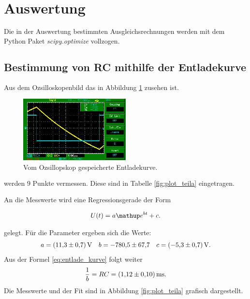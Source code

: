 \section{Auswertung}
Die in der Auswertung bestimmten Ausgleichsrechnungen werden mit
dem Python Paket \emph{scipy.optimize} vollzogen.

\subsection{Bestimmung von RC mithilfe der Entladekurve}

Aus dem Ozsilloskopenbild das in Abbildung \ref{fig:entladekurve} zusehen ist.

\begin{figure}
  \centering
  \includegraphics[width=0.5\textwidth]{pics/bilda_508hz.png}
  \caption{Vom Ozsillopskop gespeicherte Entladekurve.}
  \label{fig:entladekurve}
\end{figure}
werden  $9$ Punkte vermessen.
Diese sind in Tabelle \ref{fig:plot_teila} eingetragen.
\FloatBarrier

\FloatBarrier
An die Messwerte wird eine Regressionsgerade der Form

\begin{equation*}
  U(t)=a\map{e}^{bt}+c.
\end{equation*}

gelegt.
Für die Parameter ergeben sich die Werte:
\begin{equation}
  \label{eq:parameter_teila}
a=\SI{11.3\pm0.7}{\volt} \quad b=\num{-780.5\pm67.7} \quad c=\SI{-5.3\pm0.7}{\volt}.
\end{equation}
Aus der Formel  \eqref{eq:entlade_kurve} folgt weiter
\begin{equation}
  \frac{1}{b}=RC=\SI{1.12\pm0.1}{\milli\second}.
\end{equation}
Die Messwerte und der Fit sind in Abbildung \ref{fig:plot_teila} grafisch
dargestellt.


